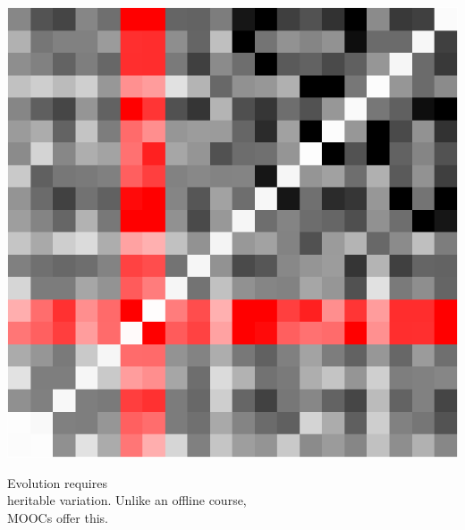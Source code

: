 \documentclass[14pt]{beamer}
\begin{document}
\begin{frame}[nofills]
\begin{center}
\includegraphics[height=0.9\textheight]{covariance-first-twenty-highlighted.pdf}
\end{center}
\end{frame}


\begin{frame}[nofills]
\Huge
\vfill
  Evolution requires \\
  \quad heritable variation.
\vfill\pause
  Unlike an offline course, \\
  \quad MOOCs offer this.
\vfill
\end{frame}
\end{document}
